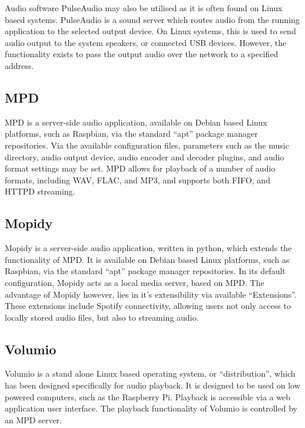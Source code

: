 \documentclass[11pt,a4paper,headinclude=false,footinclude=false]{scrreprt}
\begin{document}
Audio software PulseAudio may also be utilised as it is often found on
Linux based systems. PulseAudio is a sound server which routes audio
from the running application to the selected output device. On Linux
systems, this is used to send audio output to the system speakers, or
connected USB devices. However, the functionality exists to pass the
output audio over the network to a specified address\cite{Pulse14}.

\subsection{MPD}\label{mpd}

MPD is a server-side audio application, available on Debian based Linux
platforms, such as Raspbian, via the standard ``apt'' package manager
repositories. Via the available configuration files, parameters such as
the music directory, audio output device, audio encoder and decoder
plugins, and audio format settings may be set. MPD allows for playback
of a number of audio formats, including WAV, FLAC, and MP3, and supports
both FIFO, and HTTPD streaming\cite{MPD18}.

\subsection{Mopidy}\label{mopidy}

Mopidy is a server-side audio application, written in python, which
extends the functionality of MPD. It is available on Debian based Linux
platforms, such as Raspbian, via the standard ``apt'' package manager
repositories. In its default configuration, Mopidy acts as a local media
server, based on MPD. The advantage of Mopidy however, lies in it's
extensibility via available ``Extensions''. These extensions include
Spotify connectivity, allowing users not only access to locally stored
audio files, but also to streaming audio.

\subsection{Volumio}\label{volumio}

Volumio is a stand alone Linux based operating system, or
``distribution'', which has been designed specifically for audio
playback\cite{Volumio18}. It is designed to be used on low powered
computers, such as the Raspberry Pi. Playback is accessible via a web
application user interface. The playback functionality of Volumio is
controlled by an MPD server.
\end{document}
